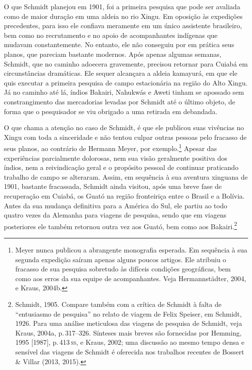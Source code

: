 O que Schmidt planejou em 1901, foi a primeira pesquisa que pode ser
avaliada como de maior duração em uma aldeia no rio Xingu. Em oposição
às expedições precedentes, para isso ele confiava meramente em um único
assistente brasileiro, bem como no recrutamento e no apoio de
acompanhantes indígenas que mudavam constantemente. No entanto, ele não
conseguiu por em prática seus planos, que pareciam bastante modernos.
Após apenas algumas semanas, Schmidt, que no caminho adoecera
gravemente, precisou retornar para Cuiabá em circunstâncias dramáticas.
Ele sequer alcançara a aldeia kamayurá, em que ele quis executar a
primeira pesquisa de campo estacionária na região do Alto Xingu. Já no
caminho até lá, índios Bakairi, Nahukwás e Aweti tinham se apossado sem
constrangimento das mercadorias levadas por Schmidt até o último objeto,
de forma que o pesquisador se viu obrigado a uma retirada em debandada.

O que chama a atenção no caso de Schmidt, é que ele publicou suas
vivências no Xingu com toda a sinceridade e não tentou culpar outras
pessoas pelo fracasso de seus planos, ao contrário de Hermann Meyer, por
exemplo.\footnote{Meyer nunca publicou a abrangente monografia esperada.
  Em sequência à sua segunda expedição saíram apenas alguns poucos
  artigos. Ele atribuiu o fracasso de sua pesquisa sobretudo às
  difíceis condições geográficas, bem como aos erros da sua equipe de
  acompanhantes. Veja Hermannstädter, 2004, e Kraus, 2004b.} Apesar das
experiências parcialmente dolorosas, nem sua visão geralmente positiva
dos índios, nem a reivindicação geral e o propósito pessoal de
continuar praticando trabalho de campo se alteraram. Assim, em
sequência à sua aventura xinguana de 1901, bastante fracassada, Schmidt
ainda visitou, após uma breve fase de recuperação em Cuiabá, os Guató na
região fronteiriça entre o Brasil e a Bolívia. Antes da sua mudança
definitiva para a América do Sul, ele partiu ao todo quatro vezes da
Alemanha para viagens de pesquisa, sendo que em viagens posteriores ele
também retornou outra vez aos Guató, bem como aos Bakairi.\footnote{Schmidt,
  1905. Compare também com a crítica de Schmidt à falta de
  ``entusiasmo de pesquisa'' no relato de viagem de Felix Speiser, em
  Schmidt, 1926. Para uma análise meticulosa das viagens de pesquisa
  de Schmidt, veja Kraus, 2004a, p.\,317--326. Sínteses mais breves são
  fornecidas por Hemming, 1995 {[}1987{]}, p.\,413\,\textsc{ss}, e Kraus, 2002; uma
  discussão ao mesmo tempo densa e sensível das viagens de Schmidt é
  oferecida nos trabalhos recentes de Bossert \& Villar (2013, 2015).}

